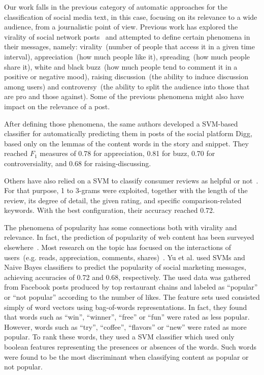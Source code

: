 Our work falls in the previous category of automatic approaches for the classification of social media text, in this case, focusing on its relevance to a wide audience, from a journalistic point of view. Previous work has explored the virality of social network posts~\citep{guerinietal2011TextVirality} and attempted to define certain phenomena in their messages, namely: virality~(number of people that access it in a given time interval), appreciation~(how much people like it), spreading~(how much people share it), white and black buzz~(how much people tend to comment it in a positive or negative mood), raising discussion~(the ability to induce discussion among users) and controversy~(the ability to split the audience into those that are pro and those against).
Some of the previous phenomena might also have impact on the relevance of a post.

After defining those phenomena\citep{guerinietal2011TextVirality}, the same authors developed a SVM-based classifier for automatically predicting them in posts of the social platform Digg, based only on the lemmas of the content words in the story and snippet.
They reached $F_1$ measures of 0.78 for appreciation, 0.81 for buzz, 0.70 for controversiality, and 0.68 for raising-discussing.

Others have also relied on a SVM to classify consumer reviews as helpful or not~\citep{Ching2013SocialNLP}.
For that purpose, 1 to 3-grams were exploited, together with the length of the review, its degree of detail, the given rating, and specific comparison-related keywords. With the best configuration, their accuracy reached 0.72.

The phenomena of popularity has some connections both with virality and relevance.
In fact, the prediction of popularity of web content has been surveyed elsewhere~\citep{Tatar2014PredictPopularity}.
Most research on the topic has focused on the interactions of users~(e.g. reads, appreciation, comments, shares)~\citep{Szabo2010PredictPopularity}. Yu et al. \citep{Yu2011PopularityMarketingMessages} used SVMs and Naive Bayes classifiers to predict the popularity of social marketing messages, achieving accuracies of 0.72 and 0.68, respectively. The used data was gathered from Facebook posts produced by top restaurant chains and labeled as ``popular'' or ``not popular'' according to the number of likes.  The feature sets used consisted simply of word vectors using bag-of-words representations. In fact, they found that words such as ``win'', ``winner'', ``free'' or ``fun'' were rated as less popular. However, words such as ``try'', ``coffee'', ``flavors'' or ``new'' were  rated as more popular. To rank these words, they used a SVM classifier which used only boolean features representing the presences or absences of the words. Such words were found to be the most discriminant when classifying content as popular or not popular.   

